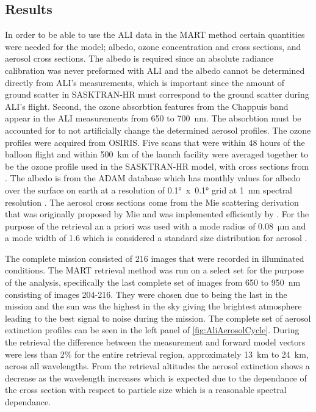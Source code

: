 \documentclass[12pt]{article}
\begin{document}
\subsection{Results}

In order to be able to use the ALI data in the MART method certain quantities were needed for the model; albedo, ozone concentration and cross sections, and aerosol cross sections. The albedo is required since an absolute radiance calibration was never preformed with ALI and the albedo cannot be determined directly from ALI's measurements, which is important since the amount of ground scatter in SASKTRAN-HR must correspond to the ground scatter during ALI's flight. Second, the ozone absorbtion features from the Chappuis band appear in the ALI measurements from 650 to 700~nm. The absorbtion must be accounted for to not artificially change the determined aerosol profiles. The ozone profiles were acquired from OSIRIS. Five scans that were within 48 hours of the balloon flight and  within 500~km of the launch facility were averaged together to be the ozone profile used in the SASKTRAN-HR model, with cross sections from \cite{Burrows1999}. The albedo is from the ADAM database which has monthly values for albedo over the surface on earth at a resolution of 0.1\si{\degree}~x~0.1\si{\degree} grid at 1~nm spectral resolution \citep{Muller2013}. The aerosol cross sections come from the Mie scattering derivation that was originally proposed by Mie and was implemented efficiently by \cite{Wiscombe1980}. For the purpose of the retrieval an a priori was used with a mode radius of 0.08~$\si{\micro\metre}$  and a mode width of 1.6 which is considered a standard size distribution for aerosol \citep{Deshler2003}.

The complete mission consisted of 216 images that were recorded in illuminated conditions. The MART retrieval method was run on a select set for the purpose of the analysis, specifically the last complete set of images from 650 to 950~nm consisting of images 204-216. They were chosen due to being the last in the mission and the sun was the highest in the sky giving the brightest atmosphere leading to the best signal to noise during the mission. The complete set of aerosol extinction profiles can be seen in the left panel of \autoref{fig:AliAerosolCycle}. During the retrieval the difference between the measurement and forward model vectors were less than 2\% for the entire retrieval region, approximately 13~km to 24~km, across all wavelengths. From the retrieval altitudes the aerosol extinction shows a decrease as the wavelength increases which is expected due to the dependance of the cross section with respect to particle size which is a reasonable spectral dependance.
\end{document}
